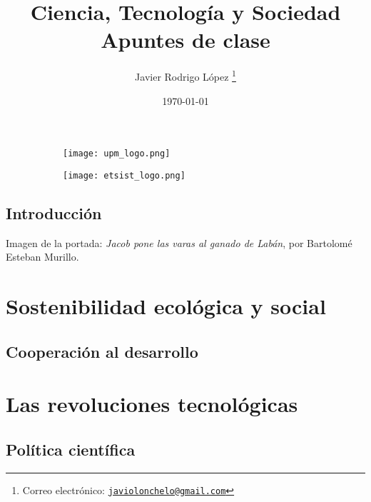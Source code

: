 \documentclass[a4paper]{book}
\title{\Huge Ciencia, Tecnología y Sociedad\\\vspace*{5pt}
\Large Apuntes de clase}
\author{Javier Rodrigo López \thanks{Correo electrónico: \href{mailto:javiolonchelo@gmail.com}{\texttt{javiolonchelo@gmail.com}}}}
\date{\today}
\begin{document}
\setlength{\wpYoffset}{0 cm}
\maketitle


\begin{figure}[t!]
\centering
	\begin{subfigure}[b]{0.65\linewidth}
		\texttt{[image: upm\_logo.png]}
	\end{subfigure}
	\begin{subfigure}[b]{0.25\linewidth}
		\texttt{[image: etsist\_logo.png]}
	\end{subfigure}
\end{figure}

\newpage
{}
{}
\section*{Introducción}
Imagen de la portada: \textsl{Jacob pone las varas al ganado de Labán}, por Bartolomé Esteban Murillo.
\newpage

\setlength{\parskip}{0em}
\tableofcontents 
\setlength{\parskip}{0.5em}

\chapter{Sostenibilidad ecológica y social}
\section{Cooperación al desarrollo}

\chapter{Las revoluciones tecnológicas}
\section{Política científica}
\end{document}
